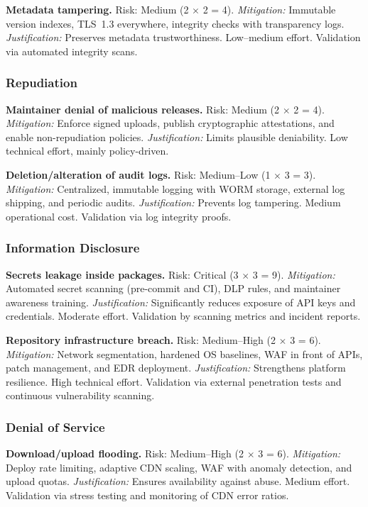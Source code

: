 \documentclass[letterpaper,12pt]{report}
\begin{document}
\textbf{Metadata tampering.}  
Risk: Medium (2 $\times$ 2 = 4).  
\emph{Mitigation:} Immutable version indexes, TLS~1.3 everywhere, integrity checks 
with transparency logs.  
\emph{Justification:} Preserves metadata trustworthiness. Low--medium effort. Validation 
via automated integrity scans.  

\subsubsection*{Repudiation}

\textbf{Maintainer denial of malicious releases.}  
Risk: Medium (2 $\times$ 2 = 4).  
\emph{Mitigation:} Enforce signed uploads, publish cryptographic attestations, and enable 
non-repudiation policies.  
\emph{Justification:} Limits plausible deniability. Low technical effort, mainly policy-driven.  

\textbf{Deletion/alteration of audit logs.}  
Risk: Medium--Low (1 $\times$ 3 = 3).  
\emph{Mitigation:} Centralized, immutable logging with WORM storage, external log shipping, 
and periodic audits.  
\emph{Justification:} Prevents log tampering. Medium operational cost. Validation via 
log integrity proofs.  

\subsubsection*{Information Disclosure}

\textbf{Secrets leakage inside packages.}  
Risk: Critical (3 $\times$ 3 = 9).  
\emph{Mitigation:} Automated secret scanning (pre-commit and CI), DLP rules, and maintainer 
awareness training.  
\emph{Justification:} Significantly reduces exposure of API keys and credentials. Moderate 
effort. Validation by scanning metrics and incident reports.  

\textbf{Repository infrastructure breach.}  
Risk: Medium--High (2 $\times$ 3 = 6).  
\emph{Mitigation:} Network segmentation, hardened OS baselines, WAF in front of APIs, 
patch management, and EDR deployment.  
\emph{Justification:} Strengthens platform resilience. High technical effort. Validation via 
external penetration tests and continuous vulnerability scanning.  

\subsubsection*{Denial of Service}

\textbf{Download/upload flooding.}  
Risk: Medium--High (2 $\times$ 3 = 6).  
\emph{Mitigation:} Deploy rate limiting, adaptive CDN scaling, WAF with anomaly detection, 
and upload quotas.  
\emph{Justification:} Ensures availability against abuse. Medium effort. Validation via 
stress testing and monitoring of CDN error ratios.  
\end{document}
